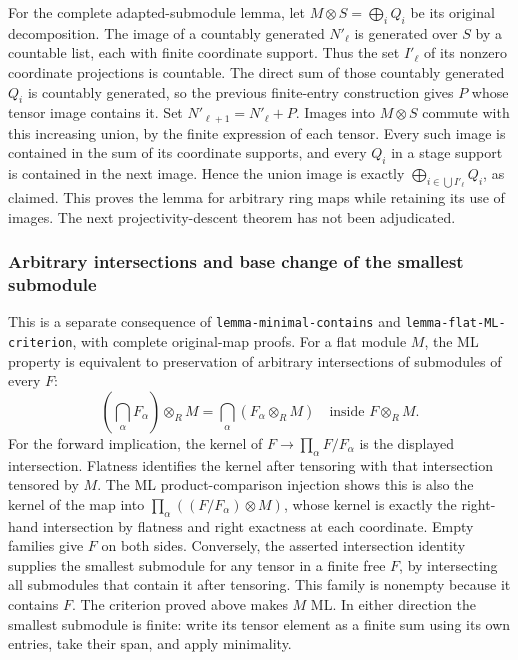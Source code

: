 For the complete adapted-submodule lemma, let \(M\otimes S=\bigoplus_i Q_i\) be its original decomposition. The image of a countably generated \(N'_\ell\) is generated over \(S\) by a countable list, each with finite coordinate support. Thus the set \(I'_\ell\) of its nonzero coordinate projections is countable. The direct sum of those countably generated \(Q_i\) is countably generated, so the previous finite-entry construction gives \(P\) whose tensor image contains it. Set \(N'_{\ell+1}=N'_\ell+P\). Images into \(M\otimes S\) commute with this increasing union, by the finite expression of each tensor. Every such image is contained in the sum of its coordinate supports, and every \(Q_i\) in a stage support is contained in the next image. Hence the union image is exactly \(\bigoplus_{i\in\bigcup I'_\ell}Q_i\), as claimed. This proves the lemma for arbitrary ring maps while retaining its use of images. The next projectivity-descent theorem has not been adjudicated.

\subsubsection{Arbitrary intersections and base change of the smallest submodule}\label{algebra-proof-013-arbitrary-intersections-and-base-change-of-the-smallest-submodule}

This is a separate consequence of \texttt{lemma-\AlgebraIdentifierBreak{}minimal-\AlgebraIdentifierBreak{}contains} and \texttt{lemma-\AlgebraIdentifierBreak{}flat-\AlgebraIdentifierBreak{}ML-\AlgebraIdentifierBreak{}criterion}, with complete original-map proofs. For a flat module \(M\), the ML property is equivalent to preservation of arbitrary intersections of submodules of every \(F\): \[
\left(\bigcap_\alpha F_\alpha\right)\otimes_R M
=\bigcap_\alpha(F_\alpha\otimes_R M)
\quad\text{inside }F\otimes_RM.
\] For the forward implication, the kernel of \(F\to\prod_\alpha F/F_\alpha\) is the displayed intersection. Flatness identifies the kernel after tensoring with that intersection tensored by \(M\). The ML product-comparison injection shows this is also the kernel of the map into \(\prod_\alpha((F/F_\alpha)\otimes M)\), whose kernel is exactly the right-hand intersection by flatness and right exactness at each coordinate. Empty families give \(F\) on both sides. Conversely, the asserted intersection identity supplies the smallest submodule for any tensor in a finite free \(F\), by intersecting all submodules that contain it after tensoring. This family is nonempty because it contains \(F\). The criterion proved above makes \(M\) ML. In either direction the smallest submodule is finite: write its tensor element as a finite sum using its own entries, take their span, and apply minimality.

